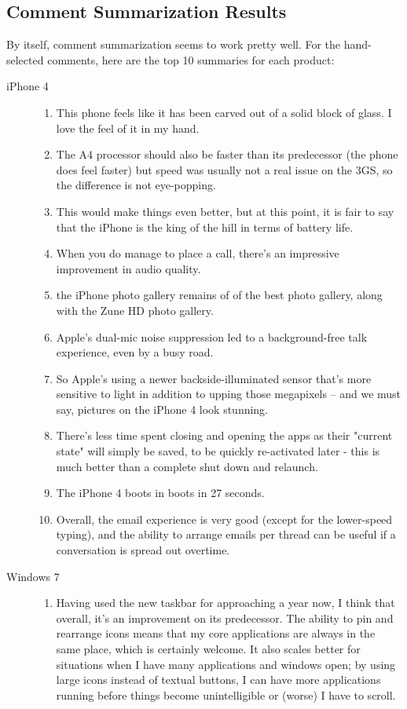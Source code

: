 \documentclass{article}
\begin{document}
\subsection{Comment Summarization Results}

By itself, comment summarization seems to work pretty well. For the
hand-selected comments, here are the top 10 summaries for each product:
\begin{description}
\item[iPhone 4]
\begin{enumerate}
\item This phone feels like it has been carved out of a solid block of glass. I love the feel of it in my hand.
\item The A4 processor should also be faster than its predecessor (the phone does feel faster) but speed was usually not a real issue on the 3GS, so the difference is not eye-popping.
\item This would make things even better, but at this point, it is fair to say that the iPhone is the king of the hill in terms of battery life.
\item When you do manage to place a call, there's an impressive improvement in audio quality.
\item the iPhone photo gallery remains of of the best photo gallery, along with the Zune HD photo gallery.
\item Apple's dual-mic noise suppression led to a background-free talk experience, even by a busy road.
\item So Apple's using a newer backside-illuminated sensor that's more sensitive to light in addition to upping those megapixels -- and we must say, pictures on the iPhone 4 look stunning.
\item There's less time spent closing and opening the apps as their "current state" will simply be saved, to be quickly re-activated later - this is much better than a complete shut down and relaunch.
\item The iPhone 4 boots in boots in 27 seconds.
\item Overall, the email experience is very good (except for the lower-speed typing), and the ability to arrange emails per thread can be useful if a conversation is spread out overtime.
\end{enumerate}
\item[Windows 7]
\begin{enumerate}
\item Having used the new taskbar for approaching a year now, I think that overall, it's an improvement on its predecessor. The ability to pin and rearrange icons means that my core applications are always in the same place, which is certainly welcome. It also scales better for situations when I have many applications and windows open; by using large icons instead of textual buttons, I can have more applications running before things become unintelligible or (worse) I have to scroll.

\end{enumerate}
\end{description}
\end{document}
